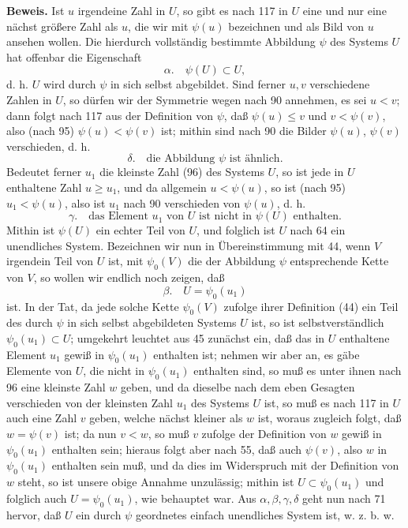 \documentclass[11pt]{article}
\newcommand{\partof}{\mathrel{\subset}}
\begin{document}
\noindent\textbf{Beweis.} Ist $u$ irgendeine Zahl in $U$, so gibt es nach 117 in $U$ eine und nur eine nächst größere Zahl als $u$, die wir mit $\psi(u)$ bezeichnen und als Bild von $u$ ansehen wollen. Die hierdurch vollständig bestimmte Abbildung $\psi$ des Systems $U$ hat offenbar die Eigenschaft
\[
\alpha.\quad \psi(U)\partof U,
\]
d. h. $U$ wird durch $\psi$ in sich selbst abgebildet. Sind ferner $u,v$ verschiedene Zahlen in $U$, so dürfen wir der Symmetrie wegen nach 90 annehmen, es sei $u<v$; dann folgt nach 117 aus der Definition von $\psi$, daß $\psi(u)\leq v$ und $v<\psi(v)$, also (nach 95) $\psi(u)<\psi(v)$ ist; mithin sind nach 90 die Bilder $\psi(u)$, $\psi(v)$ verschieden, d. h.
\[
\delta.\quad \text{die Abbildung }\psi\text{ ist ähnlich.}
\]
Bedeutet ferner $u_1$ die kleinste Zahl (96) des Systems $U$, so ist jede in $U$ enthaltene Zahl $u\geq u_1$, und da allgemein $u<\psi(u)$, so ist (nach 95) $u_1<\psi(u)$, also ist $u_1$ nach 90 verschieden von $\psi(u)$, d. h.
\[
\gamma.\quad \text{das Element }u_1\text{ von }U\text{ ist nicht in }\psi(U)\text{ enthalten.}
\]
Mithin ist $\psi(U)$ ein echter Teil von $U$, und folglich ist $U$ nach 64 ein unendliches System. Bezeichnen wir nun in Übereinstimmung mit 44, wenn $V$ irgendein Teil von $U$ ist, mit $\psi_0(V)$ die der Abbildung $\psi$ entsprechende Kette von $V$, so wollen wir endlich noch zeigen, daß
\[
\beta.\quad U=\psi_0(u_1)
\]
ist. In der Tat, da jede solche Kette $\psi_0(V)$ zufolge ihrer Definition (44) ein Teil des durch $\psi$ in sich selbst abgebildeten Systems $U$ ist, so ist selbstverständlich $\psi_0(u_1)\partof U$; umgekehrt leuchtet aus 45 zunächst ein, daß das in $U$ enthaltene Element $u_1$ gewiß in $\psi_0(u_1)$ enthalten ist; nehmen wir aber an, es gäbe Elemente von $U$, die nicht in $\psi_0(u_1)$ enthalten sind, so muß es unter ihnen nach 96 eine kleinste Zahl $w$ geben, und da dieselbe nach dem eben Gesagten verschieden von der kleinsten Zahl $u_1$ des Systems $U$ ist, so muß es nach 117 in $U$ auch eine Zahl $v$ geben, welche nächst kleiner als $w$ ist, woraus zugleich folgt, daß $w=\psi(v)$ ist; da nun $v<w$, so muß $v$ zufolge der Definition von $w$ gewiß in $\psi_0(u_1)$ enthalten sein; hieraus folgt aber nach 55, daß auch $\psi(v)$, also $w$ in $\psi_0(u_1)$ enthalten sein muß, und da dies im Widerspruch mit der Definition von $w$ steht, so ist unsere obige Annahme unzulässig; mithin ist $U\partof\psi_0(u_1)$ und folglich auch $U=\psi_0(u_1)$, wie behauptet war. Aus $\alpha,\beta,\gamma,\delta$ geht nun nach 71 hervor, daß $U$ ein durch $\psi$ geordnetes einfach unendliches System ist, w. z. b. w.
\end{document}
